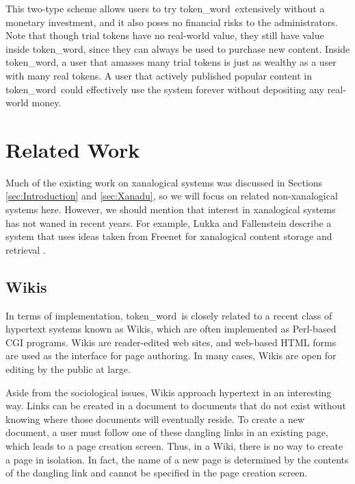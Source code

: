\documentclass{acm_proc_article-sp}
\newcommand{\tw}{token\_word}
\begin{document}

This two-type scheme allows users to try \tw \  extensively without a monetary investment, and it also poses no financial risks to the administrators.
Note that though trial tokens have no real-world value, they still have value inside \tw, since they can always be used to purchase new content.
Inside \tw, a user that amasses many trial tokens is just as wealthy as a user with many real tokens.
A user that actively published popular content in \tw \  could effectively use the system forever without depositing any real-world money.

\section{Related Work}
\label{sec:RelatedWork}

Much of the existing work on xanalogical systems was discussed in Sections \ref{sec:Introduction} and \ref{sec:Xanadu}, so we will focus on related non-xanalogical systems here.
However, we should mention that interest in xanalogical systems has not waned in recent years.
For example, Lukka and Fallenstein describe a system that uses ideas taken from Freenet for xanalogical content storage and retrieval \cite{FreenetXanadu}. 


\subsection{Wikis}

In terms of implementation, \tw \  is closely related to a recent class of hypertext systems known as Wikis, which are often implemented as Perl-based CGI programs.
Wikis are reader-edited web sites, and web-based HTML forms are used as the interface for page authoring.
In many cases, Wikis are open for editing by the public at large.

Aside from the sociological issues, Wikis approach hypertext in an interesting way.
Links can be created in a document to documents that do not exist without knowing where those documents will eventually reside.
To create a new document, a user must follow one of these dangling links in an existing page, which leads to a page creation screen.
Thus, in a Wiki, there is no way to create a page in isolation.
In fact, the name of a new page is determined by the contents of the dangling link and cannot be specified in the page creation screen.
\end{document}
